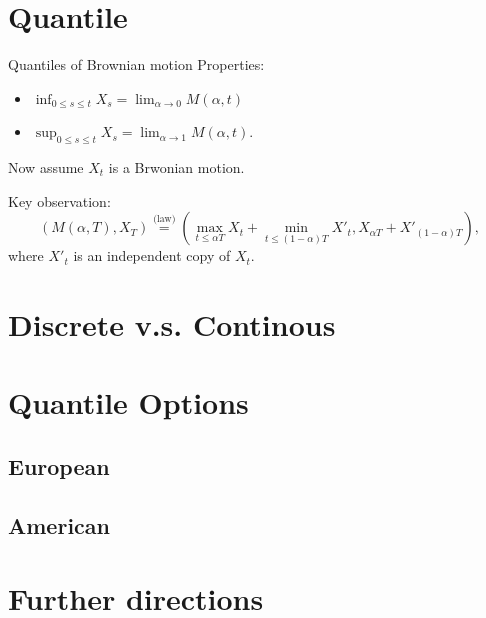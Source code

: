 \documentclass[cjk]{beamer}
\begin{document}
\section{Quantile}
\begin{frame}{Quantiles of Brownian motion}
Properties:
\begin{itemize}
\item $\displaystyle\inf_{0\leq s \leq t}  X_s = \lim_{\alpha\to 0}M(\alpha,t)$
\item $\displaystyle\sup_{0\leq s \leq t} X_s = \lim_{\alpha\to 1} M(\alpha, t)$.
\end{itemize}
\vspace{1em}
\pause

Now assume $X_t$ is a Brwonian motion.

Key observation:
\[
(M(\alpha,T),X_T) 
{\stackrel{\text{(law)}}{=}}
 (\max_{t\leq \alpha T}X_t+\min_{t\leq (1-\alpha)T}X'_t, X_{\alpha T}+X'_{(1-\alpha)T}),
\]
where $X'_t$ is an independent copy of $X_t$. 
\end{frame}

\section{Discrete v.s. Continous}



\section{Quantile Options}

\subsection{European}

\subsection{American}

\section{Further directions}
\end{document}
